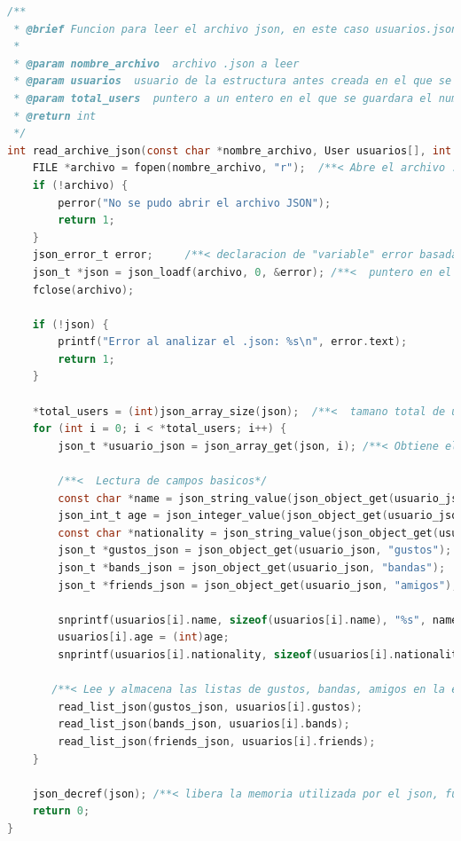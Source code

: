 \begin{lstlisting}[style=CodeStyle, language=C, caption={read\_archive\_json}, label={lst:codigo}]
    /**
 * @brief Funcion para leer el archivo json, en este caso usuarios.json
 * 
 * @param nombre_archivo  archivo .json a leer
 * @param usuarios  usuario de la estructura antes creada en el que se guardaran los datos obtenidos
 * @param total_users  puntero a un entero en el que se guardara el numero total de usuarios leidos en el .json
 * @return int 
 */
int read_archive_json(const char *nombre_archivo, User usuarios[], int *total_users) {
    FILE *archivo = fopen(nombre_archivo, "r");  /**< Abre el archivo .json en modo lectura */
    if (!archivo) {
        perror("No se pudo abrir el archivo JSON");
        return 1;
    }
    json_error_t error;     /**< declaracion de "variable" error basada en una funcion de la libreria jansson */
    json_t *json = json_loadf(archivo, 0, &error); /**<  puntero en el cual se guarda el archivo .json*/
    fclose(archivo);

    if (!json) {
        printf("Error al analizar el .json: %s\n", error.text);
        return 1;
    }

    *total_users = (int)json_array_size(json);  /**<  tamano total de usuarios basado en el arreglo json, utilizando una funcion de la libreria jansson*/
    for (int i = 0; i < *total_users; i++) {
        json_t *usuario_json = json_array_get(json, i); /**< Obtiene el objeto json, basada en el usuario[i] */

        /**<  Lectura de campos basicos*/
        const char *name = json_string_value(json_object_get(usuario_json, "nombre"));  /**<  almacena el nombre del usuario[i]*/
        json_int_t age = json_integer_value(json_object_get(usuario_json, "edad"));     /**<  almacena la edad del usuario[i]*/
        const char *nationality = json_string_value(json_object_get(usuario_json, "nacionalidad"));  /**< almacena la nacionalidad del usuario[i] */
        json_t *gustos_json = json_object_get(usuario_json, "gustos");  /**< almacena los gustos del usuario[i] */
        json_t *bands_json = json_object_get(usuario_json, "bandas");   /**< almacena las bandas del usuario[i] */
        json_t *friends_json = json_object_get(usuario_json, "amigos"); /**< almacena los amigos del usuario[i] */

        snprintf(usuarios[i].name, sizeof(usuarios[i].name), "%s", name);  /**<  copia el nombre a la estructura user*/
        usuarios[i].age = (int)age;                                        /**<  copia la edad a la estructura user*/
        snprintf(usuarios[i].nationality, sizeof(usuarios[i].nationality), "%s", nationality);   /**< copia la nacionalidad a la estructura user */

       /**< Lee y almacena las listas de gustos, bandas, amigos en la estructura user */
        read_list_json(gustos_json, usuarios[i].gustos);
        read_list_json(bands_json, usuarios[i].bands);
        read_list_json(friends_json, usuarios[i].friends);
    }

    json_decref(json); /**< libera la memoria utilizada por el json, funcion de la libreria jansson */
    return 0;
}
\end{lstlisting}

